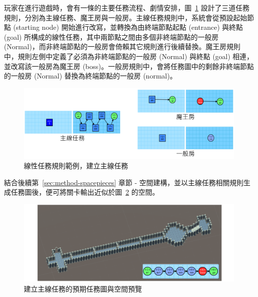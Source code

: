 玩家在進行遊戲時，會有一條的主要任務流程、劇情安排，圖~\ref{fig:missiongrammars-rules-linear-example} 設計了三道任務規則，分別為主線任務、魔王房與一般房。主線任務規則中，系統會從預設起始節點 (starting node) 開始進行改寫，並轉換為由終端節點起點 (entrance) 與終點 (goal) 所構成的線性任務，其中兩節點之間由多個非終端節點的一般房 (Normal)，而非終端節點的一般房會倚賴其它規則進行後續替換。魔王房規則中，規則左側中定義了必須為非終端節點的一般房 (Normal) 與終點 (goal) 相連，並改寫該一般房為魔王房 (boss)。一般房規則中，會將任務圖中的剩餘非終端節點的一般房 (Normal) 替換為終端節點的一般房 (normal)。

\begin{figure}[ht]
  \begin{center}
    \includegraphics[width=1.0\textwidth]{figures/missiongrammars-rules-linear-example.png}
    \caption{線性任務規則範例，建立主線任務}
    \label{fig:missiongrammars-rules-linear-example}
  \end{center}
\end{figure}

結合後續第~\ref{sec:method-spacepieces} 章節 - 空間建構，並以主線任務相關規則生成任務圖後，便可將關卡輸出近似於圖~\ref{fig:missiongrammars-rules-linear-preview} 的空間。

\begin{figure}[ht]
  \begin{center}
    \includegraphics[width=1.0\textwidth]{figures/missiongrammars-rules-linear-preview.png}
    \caption{建立主線任務的預期任務圖與空間預覽}
    \label{fig:missiongrammars-rules-linear-preview}
  \end{center}
\end{figure}

